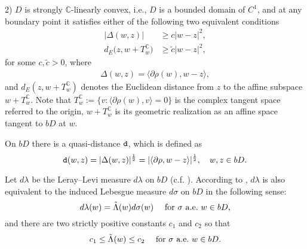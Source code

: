 \documentclass[11pt,a4paper]{amsart}
\numberwithin{equation}{section}
\def\C{\mathbb C}
\begin{document}
{2) $D$ is strongly $\C$-linearly convex, i.e., $D$ is a bounded domain of $C^1$, and at any boundary point it satisfies either of the following two equivalent conditions
\begin{align*}
 |\Delta(w,z)|&\geq c|w-z|^2, \\%
 d_E\big(z,w+T_w^{\mathbb C}\big)&\geq \tilde c|w-z|^2, %
\end{align*}
for some $c,\tilde c>0$, where
\begin{align}\label{delta}
\Delta(w,z)=\langle\partial \rho(w), w-z\rangle,
\end{align}
and $d_E(z,w+T_w^{\mathbb C})$ denotes the Euclidean distance from $z$ to the affine subspace $w+T_w^{\mathbb C}$. Note that
$T_w^{\mathbb C}:=\{v:\langle\partial \rho(w),v\rangle=0\}$ is the complex tangent space referred to the origin, $w+T_w^{\mathbb C}$ is its geometric realization as an affine space tangent to $bD$ at $w$.





On $bD$ there is a quasi-distance ${\tt d}$, which is defined as
$$ {\tt d}(w,z)= |\Delta(w,z)|^{1\over 2} = |\langle \partial\rho,w-z \rangle|^{1\over2},\quad w,z\in bD. $$

%
%


Let $d\lambda$ be the Leray--Levi measure $d\lambda$ on $bD$  (c.f. \cite{LS2014}).
According to \cite[Proposition 3.4]{LS2014},  $d\lambda$ is also equivalent to the induced Lebesgue measure $d\sigma$ on $bD$ in the following sense:
$$ d\lambda(w) =\tilde\Lambda(w)d\sigma(w)\quad {\rm \ for\ }\sigma {\rm\ a.e.\ } w\in bD,$$
and there are two strictly positive constants $c_1$ and $c_2$ so that
$$ c_1\leq \tilde\Lambda(w)\leq c_2 \quad {\rm \ for\ }\sigma {\rm\ a.e.\ } w\in bD.$$



}
\end{document}
